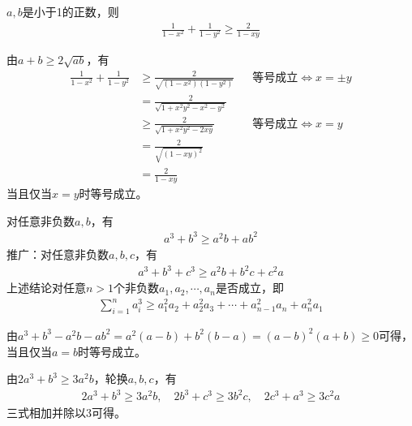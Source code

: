 \begin{example}
  $a,b$是小于1的正数，则
  \begin{align*}
    \frac1{1-x^2} + \frac1{1-y^2} \ge \frac2{1-xy}
  \end{align*}
\end{example}
由$a+b\ge2\sqrt{ab}$，有
\begin{align*}
  \frac1{1-x^2} + \frac1{1-y^2} &\ge \frac2{\sqrt{(1-x^2)(1-y^2)}} &&\text{等号成立}\iff x=\pm y\\
  &=\frac2{\sqrt{1+x^2y^2-x^2-y^2}} \\
  &\ge \frac2{\sqrt{1+x^2y^2-2xy}} &&\text{等号成立}\iff x=y\\
  &=\frac2{\sqrt{(1-xy)^2}} \\
  &=\frac2{1-xy}
\end{align*}
当且仅当$x=y$时等号成立。

\begin{example}
  对任意非负数$a,b$，有
  \begin{align*}
    a^3+b^3\ge a^2b+ab^2
  \end{align*}
  推广：对任意非负数$a,b,c$，有
  \begin{align*}
    a^3+b^3+c^3\ge a^2b+b^2c+c^2a
  \end{align*}
  上述结论对任意$n>1$个非负数$a_1,a_2,\cdots,a_n$是否成立，即
  \begin{align*}
    \sum_{i=1}^n a_i^3\ge a_1^2a_2 + a_2^2a_3 + \cdots + a_{n-1}^2a_n + a_n^2a_1
  \end{align*}
\end{example}
由$a^3+b^3-a^2b-ab^2=a^2(a-b)+b^2(b-a)=(a-b)^2(a+b)\ge0$可得，当且仅当$a=b$时等号成立。

由$2a^3+b^3\ge3a^2b$，轮换$a,b,c$，有
\begin{align*}
  2a^3+b^3\ge3a^2b,\quad 2b^3+c^3\ge3b^2c,\quad 2c^3+a^3\ge3c^2a
\end{align*}
三式相加并除以3可得。


